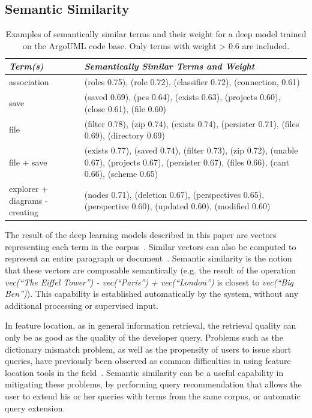 \subsection{Semantic Similarity}


\begin{table}[tb]
\centering
\small
\caption{Examples of semantically similar terms and their weight for a deep model trained on
the ArgoUML code base. Only terms with weight > 0.6 are included.}
\label{tab:semsim}
\begin{tabular}{|p{}|p{}|}
\hline \hline 
{\em Term(s)} & {\em Semantically Similar Terms and Weight}\\ \hline \hline 
association & (roles 0.75), (role 0.72), (classifier 0.72), (connection, 0.61) \\ \hline
save & (saved 0.69), (pcs 0.64), (exists 0.63), (projects 0.60), (close 0.61), (file 0.60) \\ \hline
file & (filter 0.78), (zip 0.74), (exists 0.74), (persister 0.71), (files 0.69), (directory 0.69) \\ \hline
file + save & (exists 0.77), (saved 0.74), (filter 0.73), (zip 0.72), (unable 0.67), (projects 0.67), (persister 0.67), (files 0.66), (cant 0.66), (scheme 0.65) \\ \hline
explorer + diagrams - creating & (nodes 0.71), (deletion 0.67), (perspectives 0.65), (perspective 0.60), (updated 0.60), (modified 0.60)\\
\hline \hline
\end{tabular}
\end{table}


The result of the deep learning models described in this paper are
vectors representing each term in the
corpus~\cite{mikolov_distributed_2013}. Similar vectors can also be
computed to represent an entire paragraph or
document~\cite{le_distributed_2014}.  Semantic similarity is the
notion that these vectors are composable semantically (e.g. the result
of the operation {\em vec(``The Eiffel Tower'') - vec(``Paris'') +
vec(``London'')} is closest to {\em vec(``Big Ben'')}). This
capability is established automatically by the system, without any
additional processing or supervised input.

In feature location, as in general information retrieval, the
retrieval quality can only be as good as the quality of the developer
query. Problems such as the dictionary mismatch problem, as well as
the propensity of users to issue short queries, have previously been
observed as common difficulties in using feature location tools in the
field~\cite{haiduc_effect_2011, damevski_field_2015}. Semantic
similarity can be a useful capability in mitigating these problems, by
performing query recommendation that allows the user to extend his or
her queries with terms from the same corpus, or automatic query
extension.

